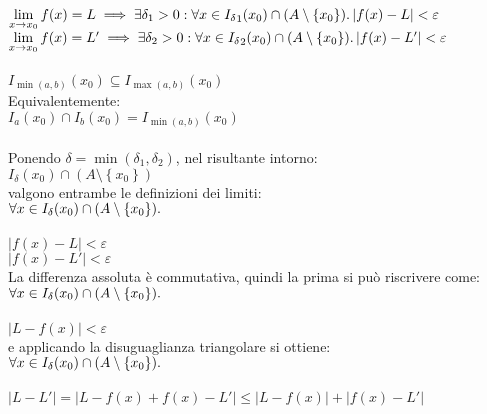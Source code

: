 \documentclass[a4paper, twoside, italian, 11pt]{book}
\newcommand{\braces}[1] {\left \{ #1 \right \}}
\newcommand{\abs}[1] {\left | #1 \right |}
\begin{document}
\noindent
$\lim\limits_{x \to x_0} f(x) = L \implies \exists \delta_1 > 0 : \forall x \in {I_\delta}_1(x_0) \cap (A \setminus \braces{x_0}) \ldotp \abs{f(x) - L} < \varepsilon$ \\

\noindent
$\lim\limits_{x \to x_0} f(x) = L' \implies \exists \delta_2 > 0 : \forall x \in {I_\delta}_2(x_0) \cap (A \setminus \braces{x_0}) \ldotp \abs{f(x) - L'} < \varepsilon$ \\\\

\noindent
$I_{\min(a, b)}(x_0) \subseteq I_{\max(a, b)}(x_0)$ \\

\noindent
Equivalentemente: \\

\noindent
$I_a(x_0) \cap I_b(x_0) = I_{\min(a, b)}(x_0)$ \\\\


\noindent
Ponendo $\delta = \min(\delta_1, \delta_2)$, nel risultante intorno: \\

$I_\delta(x_0) \cap (A \setminus \braces{x_0})$ \\

\noindent
valgono entrambe le definizioni dei limiti: \\

$\forall x \in I_\delta(x_0) \cap (A \setminus \braces{x_0}) \ldotp$ \\\\
\indent
$\abs{f(x) - L} < \varepsilon$ \\
\indent
$\abs{f(x) - L'} < \varepsilon$ \\

\noindent
La differenza assoluta è commutativa, quindi la prima si può riscrivere come: \\

$\forall x \in I_\delta(x_0) \cap (A \setminus \braces{x_0}) \ldotp$ \\\\
\indent
$\abs{L - f(x)} < \varepsilon$ \\

\noindent
e applicando la disuguaglianza triangolare si ottiene: \\

$\forall x \in I_\delta(x_0) \cap (A \setminus \braces{x_0}) \ldotp$ \\\\
\indent
$\abs{L - L'} = \abs{L - f(x) + f(x) - L'} \leq \abs{L - f(x)} + \abs{f(x) - L'}$ \\
\end{document}
